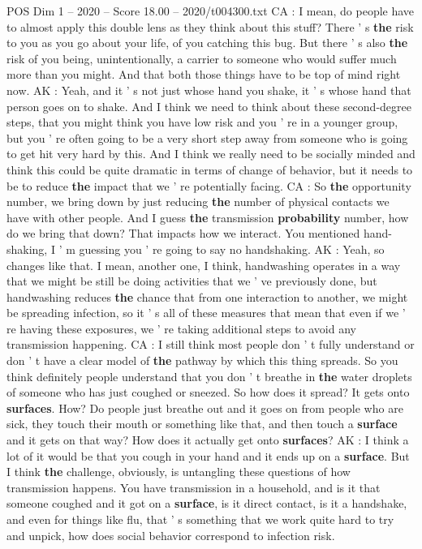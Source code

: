 \begin{textsample}{POS Dim 1 – 2020 – Score 18.00 – 2020/t004300.txt}
CA : I mean, do people have to almost apply this double lens as they think about this stuff?
There ' s \textbf{the} risk to you as you go about your life, of you catching this bug.
But there ' s also \textbf{the} risk of you being, unintentionally, a carrier to someone who would suffer much more than you might.
And that both those things have to be top of mind right now.
AK : Yeah, and it ' s not just whose hand you shake, it ' s whose hand that person goes on to shake.
And I think we need to think about these second-degree steps, that you might think you have low risk and you ' re in a younger group, but you ' re often going to be a very short step away from someone who is going to get hit very hard by this.
And I think we really need to be socially minded and think this could be quite dramatic in terms of change of behavior, but it needs to be to reduce \textbf{the} impact that we ' re potentially facing.
CA : So \textbf{the} opportunity number, we bring down by just reducing \textbf{the} number of physical contacts we have with other people.
And I guess \textbf{the} transmission \textbf{probability} number, how do we bring that down?
That impacts how we interact.
You mentioned hand-shaking, I ' m guessing you ' re going to say no handshaking.
AK : Yeah, so changes like that.
I mean, another one, I think, handwashing operates in a way that we might be still be doing activities that we ' ve previously done, but handwashing reduces \textbf{the} chance that from one interaction to another, we might be spreading infection, so it ' s all of these measures that mean that even if we ' re having these exposures, we ' re taking additional steps to avoid any transmission happening.
CA : I still think most people don ' t fully understand or don ' t have a clear model of \textbf{the} pathway by which this thing spreads.
So you think definitely people understand that you don ' t breathe in \textbf{the} water droplets of someone who has just coughed or sneezed.
So how does it spread?
It gets onto \textbf{surfaces}.
How?
Do people just breathe out and it goes on from people who are sick, they touch their mouth or something like that, and then touch a \textbf{surface} and it gets on that way?
How does it actually get onto \textbf{surfaces}?
AK : I think a lot of it would be that you cough in your hand and it ends up on a \textbf{surface}.
But I think \textbf{the} challenge, obviously, is untangling these questions of how transmission happens.
You have transmission in a household, and is it that someone coughed and it got on a \textbf{surface}, is it direct contact, is it a handshake, and even for things like flu, that ' s something that we work quite hard to try and unpick, how does social behavior correspond to infection risk.

\end{textsample}
